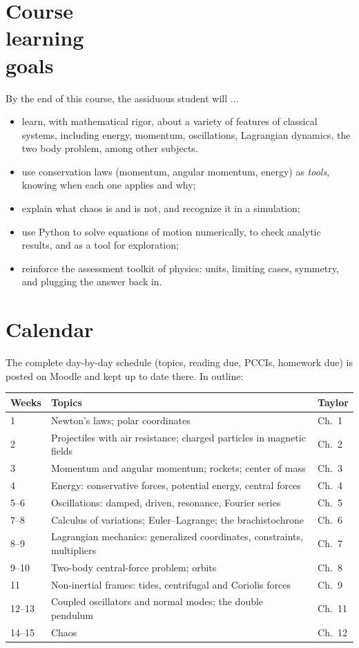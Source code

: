 \section{Course \\ learning \\ goals}
%
By the end of this course, the assiduous student will $\ldots$
\begin{itemize}
  \item[$\ldots$] learn, with mathematical rigor, about a variety of features of
    classical systems, including energy, momentum, oscillations, Lagrangian
    dynamics, the two body problem, among other subjects.
\item[$\ldots$] use conservation laws (momentum, angular momentum,
  energy) as \emph{tools}, knowing when each one applies and why;
\item[$\ldots$] explain what chaos is and is not, and recognize it in a
  simulation;
\item[$\ldots$] use Python to solve equations of motion numerically, to
  check analytic results, and as a tool for exploration;
\item[$\ldots$] reinforce the assessment toolkit of physics: units,
  limiting cases, symmetry, and plugging the answer back in.
\end{itemize}

\bigskip

\section{Calendar}
%
The complete day-by-day schedule (topics, reading due, PCCIs, homework
due) is posted on Moodle and kept up to date there. In outline:

\medskip
\begin{tabular}[t]{@{}lp{3.3in}l@{}}
\toprule
\textbf{Weeks} & \textbf{Topics} & \textbf{Taylor}\\
\midrule
1      & Newton's laws; polar coordinates & Ch.\ 1\\
2      & Projectiles with air resistance; charged particles in magnetic fields & Ch.\ 2\\
3      & Momentum and angular momentum; rockets; center of mass & Ch.\ 3\\
4      & Energy: conservative forces, potential energy, central forces & Ch.\ 4\\
5--6   & Oscillations: damped, driven, resonance, Fourier series & Ch.\ 5\\
7--8   & Calculus of variations; Euler--Lagrange; the brachistochrone & Ch.\ 6\\
8--9   & Lagrangian mechanics: generalized coordinates, constraints, multipliers & Ch.\ 7\\
9--10  & Two-body central-force problem; orbits & Ch.\ 8\\
11     & Non-inertial frames: tides, centrifugal and Coriolis forces & Ch.\ 9\\
12--13 & Coupled oscillators and normal modes; the double pendulum & Ch.\ 11\\
14--15 & Chaos & Ch.\ 12\\
\bottomrule
\end{tabular}


